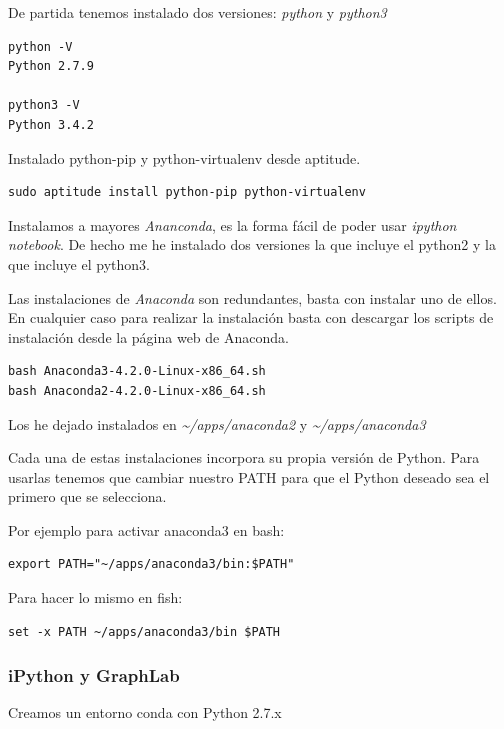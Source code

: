 \documentclass[12pt,spanish,]{article}
\begin{document}
De partida tenemos instalado dos versiones: \emph{python} y
\emph{python3}

\begin{verbatim}
python -V
Python 2.7.9

python3 -V
Python 3.4.2
\end{verbatim}

Instalado python-pip y python-virtualenv desde aptitude.

\begin{verbatim}
sudo aptitude install python-pip python-virtualenv
\end{verbatim}

Instalamos a mayores \emph{Ananconda}, es la forma fácil de poder usar
\emph{ipython notebook}. De hecho me he instalado dos versiones la que
incluye el python2 y la que incluye el python3.

Las instalaciones de \emph{Anaconda} son redundantes, basta con instalar
uno de ellos. En cualquier caso para realizar la instalación basta con
descargar los scripts de instalación desde la página web de Anaconda.

\begin{verbatim}
bash Anaconda3-4.2.0-Linux-x86_64.sh
bash Anaconda2-4.2.0-Linux-x86_64.sh
\end{verbatim}

Los he dejado instalados en \emph{\textasciitilde{}/apps/anaconda2} y
\emph{\textasciitilde{}/apps/anaconda3}

Cada una de estas instalaciones incorpora su propia versión de Python.
Para usarlas tenemos que cambiar nuestro PATH para que el Python deseado
sea el primero que se selecciona.

Por ejemplo para activar anaconda3 en bash:

\begin{verbatim}
export PATH="~/apps/anaconda3/bin:$PATH"
\end{verbatim}

Para hacer lo mismo en fish:

\begin{verbatim}
set -x PATH ~/apps/anaconda3/bin $PATH
\end{verbatim}

\subsubsection{iPython y GraphLab}\label{ipython-y-graphlab}

Creamos un entorno conda con Python 2.7.x
\end{document}
